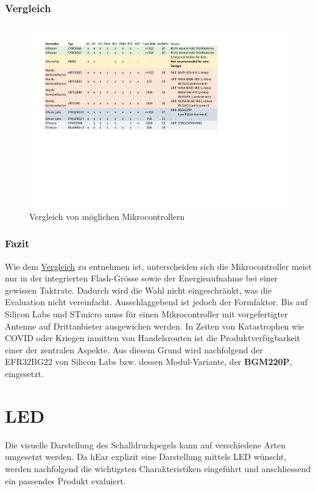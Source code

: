 \documentclass[12pt]{article}
\begin{document}
	\subsubsection{Vergleich} \label{Vergleich_uC}
	\begin{figure}[H]
		\centering
		\includegraphics[trim=55 260 230 70, width=1\linewidth]{tables/BAT_Vergleich-Mikrocontroller}
		\caption{Vergleich von möglichen Mikrocontrollern}
		\label{fig:batvergleich-mikrocontroller}
	\end{figure}
	\subsubsection{Fazit}
	Wie dem \hyperref[Vergleich_uC]{Vergleich} zu entnehmen ist, unterscheiden sich die Mikrocontroller meist nur in der integrierten Flash-Grösse sowie der Energieaufnahme bei einer gewissen Taktrate. Dadurch wird die Wahl nicht eingeschränkt, was die Evaluation nicht vereinfacht. Ausschlaggebend ist jedoch der Formfaktor. Bis auf Silicon Labs und STmicro muss für einen Mikrocontroller mit vorgefertigter Antenne auf Drittanbieter ausgewichen werden. In Zeiten von Katastrophen wie COVID oder Kriegen inmitten von Handelsrouten ist die Produktverfügbarkeit einer der zentralen Aspekte. Aus diesem Grund wird nachfolgend der EFR32BG22 von Silicon Labs bzw. dessen Modul-Variante, der \textbf{BGM220P}, eingesetzt.
	
	\newpage
	\section{LED}\label{LED}
	Die visuelle Darstellung des Schalldruckpegels kann auf verschiedene Arten umgesetzt werden. Da hEar explizit eine Darstellung mittels LED wünscht, werden nachfolgend die wichtigsten Charakteristiken eingeführt und anschlie\-ssend ein passendes Produkt evaluiert.
\end{document}
